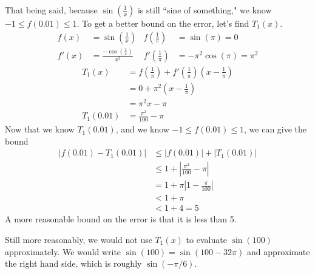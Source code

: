 \begin{solution}
That being said, because $\sin\left(\frac{1}{x}\right)$ is still ``sine of something," we know $-1 \leq f\left(0.01\right) \leq 1$. To get a better bound on the error, let's find $T_1(x)$.
\begin{align*}
f(x)&=\sin\left(\frac{1}{x}\right)
&
f\left(\frac{1}{\pi}\right)&=\sin(\pi)=0\\
f'(x)&=\frac{-\cos\left(\frac{1}{x}\right)}{x^2} &
f'\left(\frac{1}{\pi}\right)&=-\pi^2\cos(\pi)=\pi^2\end{align*}
\begin{align*}
T_1(x)&=f\left(\frac{1}{\pi}\right)+f'\left(\frac{1}{\pi}\right)\left(x-\frac{1}{\pi}\right)\\
&=0+\pi^2\left(x-\frac{1}{\pi}\right)\\&=\pi^2x-\pi\\
T_1\left(0.01\right)& = \frac{\pi^2}{100}-\pi
\end{align*}
Now that we know $T_1(0.01)$, and we know $-1 \leq f(0.01) \leq 1$, we can give the bound
\begin{align*}
\left|f(0.01)-T_1(0.01)\right|&\leq
\left|f(0.01)\right|+\left|T_1(0.01)\right|\\
&\leq 1 +\left| \frac{\pi^2}{100}-\pi\right|\\
&=1+\pi\left|1-\frac{\pi}{100}\right|\\
&<1+\pi\\
&<1+4=5
\end{align*}
A more reasonable bound on the error is that it is less than 5.

Still more reasonably, we would not use $T_1(x)$ to
           evaluate $\sin(100)$ approximately.  We would write
           $\sin(100) = \sin(100-32\pi)$ and approximate the right
           hand side, which is roughly $\sin(-\pi/6)$.
\end{solution}










